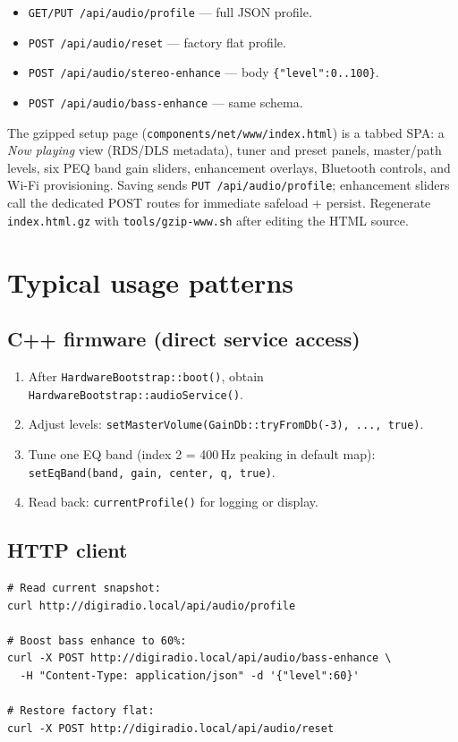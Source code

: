\begin{itemize}
  \item \texttt{GET/PUT /api/audio/profile} --- full JSON profile.
  \item \texttt{POST /api/audio/reset} --- factory flat profile.
  \item \texttt{POST /api/audio/stereo-enhance} --- body
        \texttt{\{"level":0..100\}}.
  \item \texttt{POST /api/audio/bass-enhance} --- same schema.
\end{itemize}

The gzipped setup page (\texttt{components/net/www/index.html}) is a tabbed
SPA: a \emph{Now playing} view (RDS/DLS metadata), tuner and preset panels,
master/path levels, six PEQ band gain sliders, enhancement overlays, Bluetooth
controls, and Wi-Fi provisioning. Saving sends \texttt{PUT /api/audio/profile};
enhancement sliders call the dedicated POST routes for immediate safeload +
persist. Regenerate \texttt{index.html.gz} with \texttt{tools/gzip-www.sh}
after editing the HTML source.

\section{Typical usage patterns}
\label{sec:adau1701-patterns}

\subsection{C++ firmware (direct service access)}

\begin{enumerate}
  \item After \texttt{HardwareBootstrap::boot()}, obtain
        \texttt{HardwareBootstrap::audioService()}.
  \item Adjust levels:
        \texttt{setMasterVolume(GainDb::tryFromDb(-3), ..., true)}.
  \item Tune one EQ band (index 2 = 400\,Hz peaking in default map):
        \texttt{setEqBand(band, gain, center, q, true)}.
  \item Read back: \texttt{currentProfile()} for logging or display.
\end{enumerate}

\subsection{HTTP client}

\begin{verbatim}
# Read current snapshot:
curl http://digiradio.local/api/audio/profile

# Boost bass enhance to 60%:
curl -X POST http://digiradio.local/api/audio/bass-enhance \
  -H "Content-Type: application/json" -d '{"level":60}'

# Restore factory flat:
curl -X POST http://digiradio.local/api/audio/reset
\end{verbatim}

